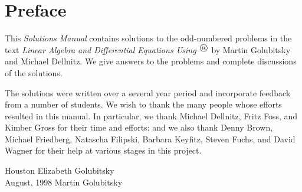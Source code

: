 \large

\section*{Preface}

This {\em Solutions Manual\/} contains solutions to the odd-numbered 
problems in the text {\em Linear Algebra and Differential Equations Using
\Matlabp$^\tm$} by Martin Golubitsky and Michael Dellnitz.  We give 
answers to the problems and complete discussions of the solutions.

\quad The solutions were written over a several year period and incorporate
feedback from a number of students.   We wish to thank the many people whose 
efforts resulted in this manual.  In particular, we thank Michael Dellnitz,  
Fritz Foss, and Kimber Gross for their time and efforts; and we also thank 
Denny Brown, Michael Friedberg, Natascha Filipski, Barbara Keyfitz, Steven 
Fuchs, and David Wagner for their help at various stages in this project.

\vspace{0.2in}

\noindent Houston \hfill Elizabeth Golubitsky \\
August, 1998  \hfill Martin Golubitsky



\normalsize
